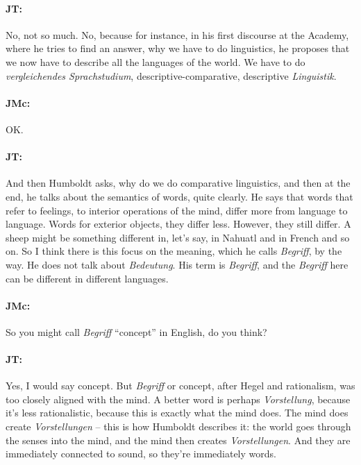 \documentclass[output=paper]{langscibook}
\begin{document}
\paragraph*{JT:} No, not so much. No, because for instance, in his first discourse at the Academy, where he tries to find an answer, why we have to do linguistics, he proposes that we now have to describe all the languages of the world. We have to do \textit{vergleichendes Sprachstudium}, descriptive-comparative, descriptive \textit{Linguistik}.


\paragraph*{JMc:} OK.


\paragraph*{JT:} And then Humboldt asks, why do we do comparative linguistics, and then at the end, he talks about the semantics of words, quite clearly. He says that words that refer to feelings, to interior operations of the mind, differ more from language to language. Words for exterior objects, they differ less. However, they still differ. A sheep might be something different in, let’s say, in Nahuatl and in French and so on. So I think there is this focus on the meaning, which he calls \textit{Begriff}, by the way. He does not talk about \textit{Bedeutung}. His term is \textit{Begriff}, and the \textit{Begriff} here can be different in different languages.


\paragraph*{JMc:} So you might call \textit{Begriff} “concept” in English, do you think?


\paragraph*{JT:} Yes, I would say concept. But \textit{Begriff} or concept, after Hegel and rationalism, was too closely aligned with the mind. A better word is perhaps \textit{Vorstellung}, because it’s less rationalistic, because this is exactly what the mind does. The mind does create \textit{Vorstellungen} – this is how Humboldt describes it: the world goes through the senses into the mind, and the mind then creates \textit{Vorstellungen}. And they are immediately connected to sound, so they’re immediately words.
\end{document}
